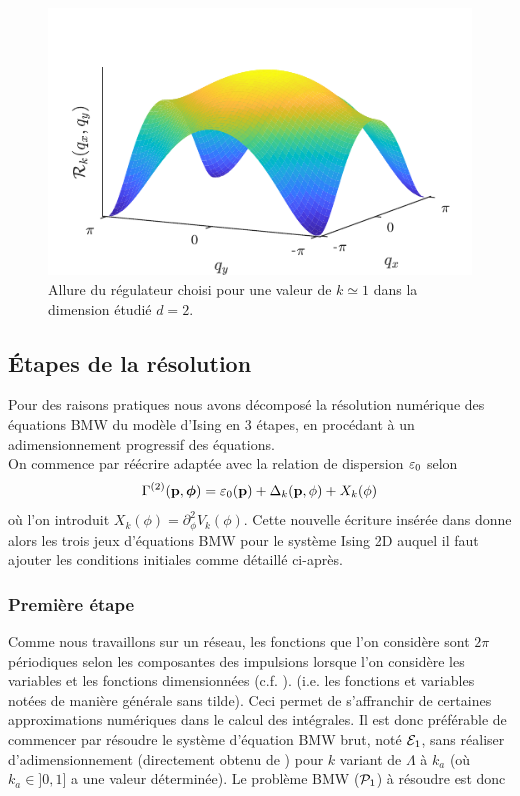 \documentclass[10pt]{article}
\begin{document}
\begin{multicols}{2}
\begin{figure}[H]
\begin{center}
	\includegraphics[width=0.8\columnwidth]{RegIsing.pdf}
\end{center}
\caption{Allure du régulateur choisi pour une valeur de $k\simeq 1$ dans la dimension étudié $d=2$.}
\end{figure}



\subsection{Étapes de la résolution}

Pour des raisons pratiques nous avons décomposé la résolution numérique des équations BMW du modèle d'Ising en 3 étapes, en procédant à un adimensionnement progressif des équations. \\

On commence par réécrire  adaptée avec la relation de dispersion $\varepsilon_0$ selon
\begin{equation}
\Gamma^{(2)}({\bf p}, \boldsymbol{ \phi}) = \varepsilon_0({\bf p}) + \Delta_k({\bf p}, \phi) + X_k(\phi)
\label{eq:decompBMWIsing2D}
\end{equation} 
où l'on introduit $X_k(\phi) = \partial_{\phi}^2 V_k(\phi)$.
Cette nouvelle écriture insérée dans  donne alors les trois jeux d'équations BMW pour le système Ising 2D auquel il faut ajouter les conditions initiales comme détaillé ci-après.


\subsubsection{Première étape}

Comme nous travaillons sur un réseau, les fonctions que l'on considère sont $2\pi$ périodiques selon les composantes des impulsions lorsque l'on considère les variables et les fonctions dimensionnées (c.f. ). (i.e. les fonctions et variables notées de manière générale sans tilde). Ceci permet de s'affranchir de certaines approximations numériques dans le calcul des intégrales. Il est donc préférable de commencer par résoudre le système d'équation BMW brut, noté $\mathcal{E}_1$, sans réaliser d'adimensionnement (directement obtenu de ) pour $k $ variant de $\Lambda$ à $k_a$ (où $k_a \in ]0, 1]$ a une valeur déterminée). Le problème BMW ($\mathcal{P}_1$) à résoudre est donc \\


\end{multicols}
\end{document}
